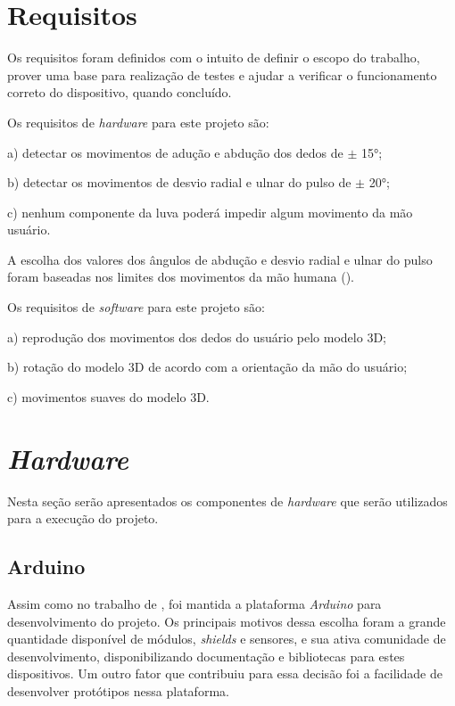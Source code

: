 \section{Requisitos}
\label{sec:requisitos}
Os requisitos foram definidos com o intuito de definir o escopo do trabalho, prover uma base para realização de testes e ajudar a verificar o funcionamento correto do dispositivo, quando concluído.

Os requisitos de \textit{hardware} para este projeto são:

\begin{compactitem}
  \item[a)] detectar os movimentos de adução e abdução dos dedos de $\pm$ \ang{15};
  \item[b)] detectar os movimentos de desvio radial e ulnar do pulso de $\pm$ \ang{20};
  \item[c)] nenhum componente da luva poderá impedir algum movimento da mão usuário.
\end{compactitem}

A escolha dos valores dos ângulos de abdução e desvio radial e ulnar do pulso foram baseadas nos limites dos movimentos da mão humana (\cite{hand_motions}).

Os requisitos de \textit{software} para este projeto são:

\begin{compactitem}
  \item[a)] reprodução dos movimentos dos dedos do usuário pelo modelo \ac{3D};
  \item[b)] rotação do modelo \ac{3D} de acordo com a orientação da mão do usuário;
  \item[c)] movimentos suaves do modelo \ac{3D}.
\end{compactitem}

\section{\textit{Hardware}}
\label{sec:hardware}

Nesta seção serão apresentados os componentes de \textit{hardware} que serão utilizados para a execução do projeto.

\subsection{Arduino}
\label{sub:arduino}
Assim como no trabalho de , foi mantida a plataforma \textit{Arduino} para desenvolvimento do projeto. Os principais motivos dessa escolha foram a grande quantidade disponível de módulos, \textit{shields} e sensores, e sua ativa comunidade de desenvolvimento, disponibilizando documentação e bibliotecas para estes dispositivos. Um outro fator que contribuiu para essa decisão foi a facilidade de desenvolver protótipos nessa plataforma.

